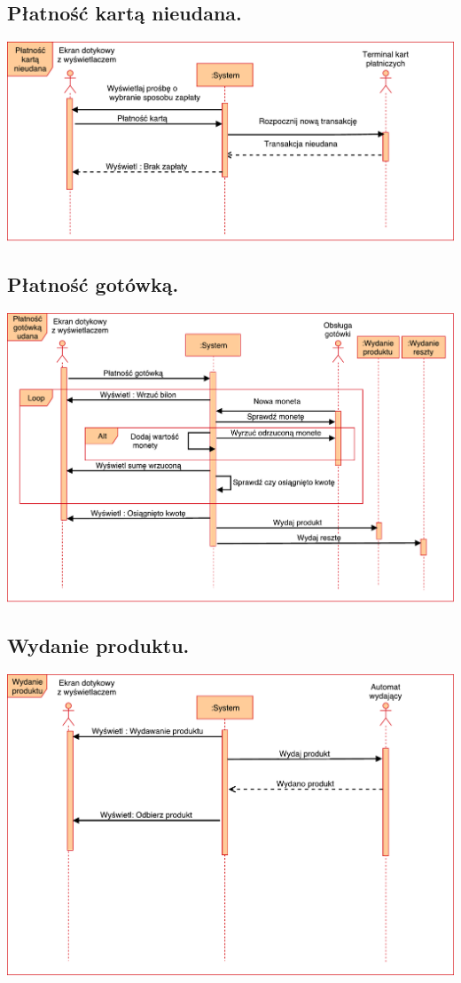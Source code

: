 \documentclass[11pt]{article}
\begin{document}
		\subsection{Płatność kartą nieudana.}
		\begin{center}
			\includegraphics[scale=0.65]{PlatnoscKartaNieudana.pdf}
		\end{center}
		\newpage
		\subsection{Płatność gotówką.}
		\begin{center}
			\includegraphics[scale=0.60]{PlatnoscGotowkaUdana.pdf}
		\end{center}
		\newpage
		\subsection{Wydanie produktu.}
		\begin{center}
			\includegraphics[scale=0.65]{WydanieProduktu.pdf}
		\end{center}
		\newpage
\end{document}
